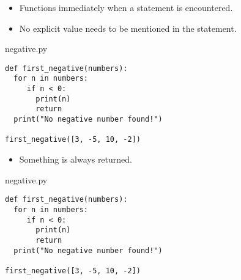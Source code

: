 \documentclass[aspectratio=1610,slidestop]{beamer}
\begin{document}
\begin{pframe}
 \begin{itemize}
  \item Functions immediately  when a  statement is encountered.
  \item No explicit value needs to be mentioned in the  statement.
 \end{itemize}
 \pause
 \medskip

 \begin{minipage}[t]{0.49\textwidth}
  \begin{pythonfile}{negative.py}
   \begin{verbatim}
def first_negative(numbers):
  for n in numbers:
     if n < 0:
       print(n)
       return
  print("No negative number found!")

first_negative([3, -5, 10, -2])
   \end{verbatim}
  \end{pythonfile}
 \end{minipage}\qquad
 \pause
 \begin{minipage}[t]{0.45\textwidth}
 \vspace{-4.15cm}
 \begin{terminal}
 \end{terminal}
 \end{minipage}
\end{pframe}


\begin{pframe}
 \begin{itemize}
  \item Something is always returned.
 \end{itemize}
 \medskip

 \begin{minipage}[t]{0.52\textwidth}
  \begin{pythonfile}{negative.py}
   \begin{verbatim}
def first_negative(numbers):
  for n in numbers:
     if n < 0:
       print(n)
       return
  print("No negative number found!")

first_negative([3, -5, 10, -2])
   \end{verbatim}
  \end{pythonfile}
 \end{minipage}\qquad
 \begin{minipage}[t]{0.42\textwidth}
 \vspace{-4.15cm}
 \begin{terminal}
 \end{terminal}
 \end{minipage}
\end{pframe}
\end{document}

